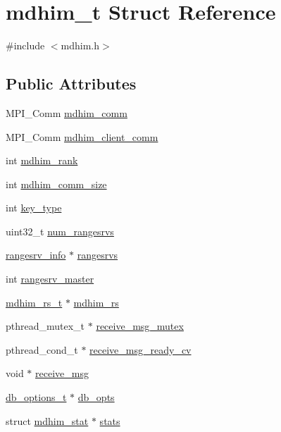 \hypertarget{structmdhim__t}{\section{mdhim\-\_\-t Struct Reference}
\label{d8/dbc/structmdhim__t}
}


{\ttfamily \#include $<$mdhim.\-h$>$}

\subsection*{Public Attributes}
\begin{DoxyCompactItemize}
\item 
M\-P\-I\-\_\-\-Comm \hyperlink{structmdhim__t_a9772a2d123d58e9cd3e4514b860aee97}{mdhim\-\_\-comm}
\item 
M\-P\-I\-\_\-\-Comm \hyperlink{structmdhim__t_aa7869e9170df4067e8ee986f5e6fda69}{mdhim\-\_\-client\-\_\-comm}
\item 
int \hyperlink{structmdhim__t_a501753bb85acfd853c73d3c888714b20}{mdhim\-\_\-rank}
\item 
int \hyperlink{structmdhim__t_ab4bf1dd32ae146382cade22a706c1380}{mdhim\-\_\-comm\-\_\-size}
\item 
int \hyperlink{structmdhim__t_ab38232f8b8b48edf417c87088d81d6e4}{key\-\_\-type}
\item 
uint32\-\_\-t \hyperlink{structmdhim__t_a41b224b41799585edf8a8b2b2f4626cc}{num\-\_\-rangesrvs}
\item 
\hyperlink{structrangesrv__info}{rangesrv\-\_\-info} $\ast$ \hyperlink{structmdhim__t_ae05a450ac4f312ae4bdb9c1ea52e53e0}{rangesrvs}
\item 
int \hyperlink{structmdhim__t_aec7f0b0a3e8bf81c839a90ec38b0809b}{rangesrv\-\_\-master}
\item 
\hyperlink{structmdhim__rs__t}{mdhim\-\_\-rs\-\_\-t} $\ast$ \hyperlink{structmdhim__t_ae555c224ade4584fcc3895f8ea19a302}{mdhim\-\_\-rs}
\item 
pthread\-\_\-mutex\-\_\-t $\ast$ \hyperlink{structmdhim__t_ae5abe6f33b5951a30f582fda42292706}{receive\-\_\-msg\-\_\-mutex}
\item 
pthread\-\_\-cond\-\_\-t $\ast$ \hyperlink{structmdhim__t_ac4a79eb13f34377840b924c41802f0fb}{receive\-\_\-msg\-\_\-ready\-\_\-cv}
\item 
void $\ast$ \hyperlink{structmdhim__t_abc3233b7d61111d19bb7ac0222a918fc}{receive\-\_\-msg}
\item 
\hyperlink{structdb__options__t}{db\-\_\-options\-\_\-t} $\ast$ \hyperlink{structmdhim__t_a16fd571ca5544d43d939fb75eb3b8800}{db\-\_\-opts}
\item 
struct \hyperlink{structmdhim__stat}{mdhim\-\_\-stat} $\ast$ \hyperlink{structmdhim__t_a69e06bfc0fb536ac2759b3ebb4c8cca1}{stats}
\end{DoxyCompactItemize}


